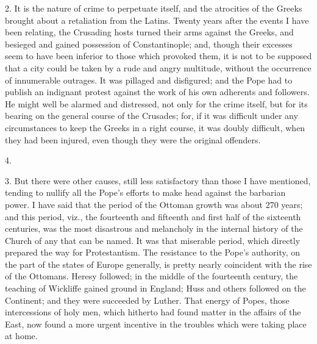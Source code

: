 2. It is the nature of crime
to perpetuate itself, and the atrocities of the Greeks brought about a
retaliation from the Latins. Twenty years after the events I have been
relating, the Crusading hosts turned their arms against the Greeks,
and besieged and gained possession of Constantinople; and, though
their excesses seem to have been inferior to those which provoked
them, it is not to be supposed that a city could be taken by a rude
and angry multitude, without the occurrence of innumerable outrages.
It was pillaged and disfigured; and the Pope had to publish an
indignant protest against the work of his own adherents and followers.
He might well be alarmed and distressed, not only for the crime
itself, but for its bearing on the general course of the Crusades;
for, if it was difficult under any circumstances to keep the Greeks in
a right course, it was doubly difficult, when they had been injured,
even though they were the original offenders.

4.

3. But there were other
causes, still less satisfactory than those I have mentioned, tending
to nullify all the Pope's efforts to make head against the barbarian
power. I have said that the period of the Ottoman growth was about 270
years; and this period, viz., the fourteenth and fifteenth and first
half of the sixteenth centuries, was the most disastrous and
melancholy in the internal history of the Church of any that can be
named. It was that miserable period, which directly prepared the way
for Protestantism. The resistance to the Pope's authority, on the part
of the states of Europe generally, is pretty nearly coincident with
the rise of the Ottomans. Heresy followed; in the middle of the
fourteenth century, the teaching of Wickliffe gained ground in
England; Huss and others followed on the Continent; and they
were succeeded by Luther. That energy of Popes, those intercessions of
holy men, which hitherto had found matter in the affairs of the East,
now found a more urgent incentive in the troubles which were taking
place at home.

